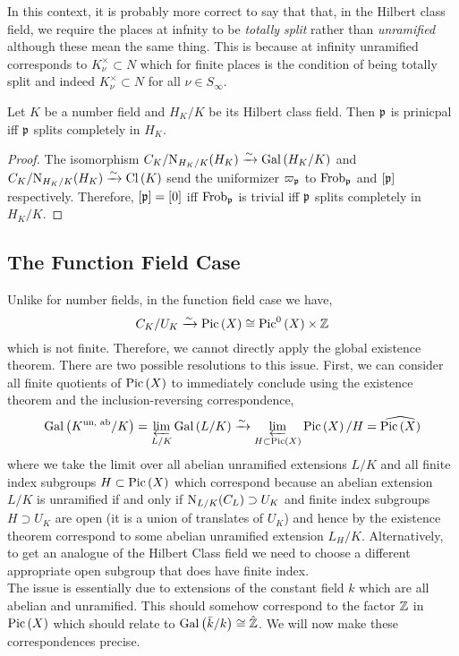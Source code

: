 \documentclass[12pt]{article}
\begin{document}
\begin{rmk}
In this context, it is probably more correct to say that that, in the Hilbert class field, we require the places at infnity to be \textit{totally split} rather than \textit{unramified} although these mean the same thing. This is because at infinity unramified corresponds to $K_\nu^\times \subset N$ which for finite places is the condition of being totally split and indeed $K_\nu^\times \subset N$ for all $\nu \in S_\infty$.
\end{rmk}

\begin{prop}
Let $K$ be a number field and $H_K / K$ be its Hilbert class field. Then $\mathfrak{p}$ is prinicpal iff $\mathfrak{p}$ splits completely in $H_K$.
\end{prop}

\begin{proof}
The isomorphism $C_K/\mathrm{N}_{H_K/K}(H_K) \xrightarrow{\sim} \mathrm{Gal}\left( H_K/K \right)$ and $C_K/\mathrm{N}_{H_K/K}(H_K) \xrightarrow{\sim} \mathrm{Cl} \left( K \right)$ send the uniformizer $\varpi_{\mathfrak{p}}$ to $\mathrm{Frob}_{\mathfrak{p}}$ and $[\mathfrak{p}]$ respectively. Therefore, $[\mathfrak{p}] = [0]$ iff $\mathrm{Frob}_{\mathfrak{p}}$ is trivial iff $\mathfrak{p}$ splits completely in $H_K/K$. 
\end{proof}

\subsection{The Function Field Case}

Unlike for number fields, in the function field case we have,
\[ C_K / U_K \xrightarrow{\sim} \mathrm{Pic} \left( X \right) \cong \mathrm{Pic}^0\left( X \right) \times \mathbb{Z} \]
which is not finite. Therefore, we cannot directly apply the global existence theorem. There are two possible resolutions to this issue. First, we can consider all finite quotients of $\mathrm{Pic} \left( X \right)$ to immediately conclude using the existence theorem and the inclusion-reversing correspondence,
\[ \mathrm{Gal}\left( K^{\text{un, ab}}/K \right) = \varprojlim_{L/K} \mathrm{Gal}\left( L/K \right) \xrightarrow{\sim} \varprojlim_{H \subset \mathrm{Pic} \left( X \right)} \mathrm{Pic} \left( X \right) / H = \widehat{\mathrm{Pic} \left( X \right)} \]
where we take the limit over all abelian unramified extensions $L/K$ and all finite index subgroups $H \subset \mathrm{Pic} \left( X \right)$ which correspond because an abelian extension $L/K$ is unramified if and only if $\mathrm{N}_{L/K}(C_L) \supset U_K$ and finite index subgroups $H \supset U_K$ are open (it is a union of translates of $U_K$) and hence by the existence theorem correspond to some abelian unramified extension $L_H / K$.
Alternatively, to get an analogue of the Hilbert Class field we need to choose a different appropriate open subgroup that does have finite index. 
\bigskip\\
The issue is essentially due to extensions of the constant field $k$ which are all abelian and unramified. This should somehow correspond to the factor $\mathbb{Z}$ in $\mathrm{Pic} \left( X \right)$ which should relate to $\mathrm{Gal}\left( \bar{k}/k \right) \cong \hat{\mathbb{Z}}$. We will now make these correspondences precise. 
\end{document}
